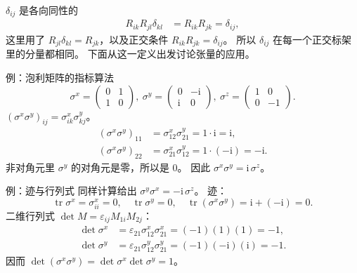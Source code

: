 \documentclass[fontset=windows, chinese, 10pt, xcolor=dvipsnames]{beamer}
\begin{document}
\begin{frame}{$\delta_{ij}$ 是各向同性的}
  \begin{align*}
    R_{ik}R_{jl}\delta_{kl}
    &= R_{ik}R_{jk}
     = \delta_{ij},
  \end{align*}
  这里用了 $R_{jl}\delta_{kl}=R_{jk}$，以及正交条件 $R_{ik}R_{jk}=\delta_{ij}$。
  所以 $\delta_{ij}$ 在每一个正交标架里的分量都相同。
  下面从这一定义出发讨论张量的应用。
\end{frame}

\begin{frame}{例：泡利矩阵的指标算法}
  \begin{equation*}
    \sigma^x=
    \begin{pmatrix}0&1\\1&0\end{pmatrix},\ 
    \sigma^y=
    \begin{pmatrix}0&-\mathrm{i}\\\mathrm{i}&0\end{pmatrix},\ 
    \sigma^z=
    \begin{pmatrix}1&0\\0&-1\end{pmatrix}.
  \end{equation*}
  $(\sigma^x\sigma^y)_{ij}=\sigma^x_{ik}\sigma^y_{kj}$。
  \begin{align*}
    (\sigma^x\sigma^y)_{11}
    &= \sigma^x_{12}\sigma^y_{21}
     = 1\cdot\mathrm{i}
     = \mathrm{i},\\
    (\sigma^x\sigma^y)_{22}
    &= \sigma^x_{21}\sigma^y_{12}
     = 1\cdot(-\mathrm{i})
     = -\mathrm{i}.
  \end{align*}
  非对角元里 $\sigma^y$ 的对角元是零，所以是 $0$。
  因此 $\sigma^x\sigma^y=\mathrm{i}\,\sigma^z$。
\end{frame}

\begin{frame}{例：迹与行列式}
  同样计算给出 $\sigma^y\sigma^x=-\mathrm{i}\,\sigma^z$。
  迹：
  \begin{equation*}
    \operatorname{tr}\sigma^x=\sigma^x_{ii}=0,
    \quad
    \operatorname{tr}\sigma^y=0,
    \quad
    \operatorname{tr}(\sigma^x\sigma^y)
    =\mathrm{i}+(-\mathrm{i})=0.
  \end{equation*}
  二维行列式 $\det M=\varepsilon_{ij}M_{1i}M_{2j}$：
  \begin{align*}
    \det\sigma^x
    &= \varepsilon_{21}\sigma^x_{12}\sigma^x_{21}
     = (-1)(1)(1)
     = -1,\\
    \det\sigma^y
    &= \varepsilon_{21}\sigma^y_{12}\sigma^y_{21}
     = (-1)(-\mathrm{i})(\mathrm{i})
     = -1.
  \end{align*}
  因而 $\det(\sigma^x\sigma^y)=\det\sigma^x\det\sigma^y=1$。
\end{frame}
\end{document}
